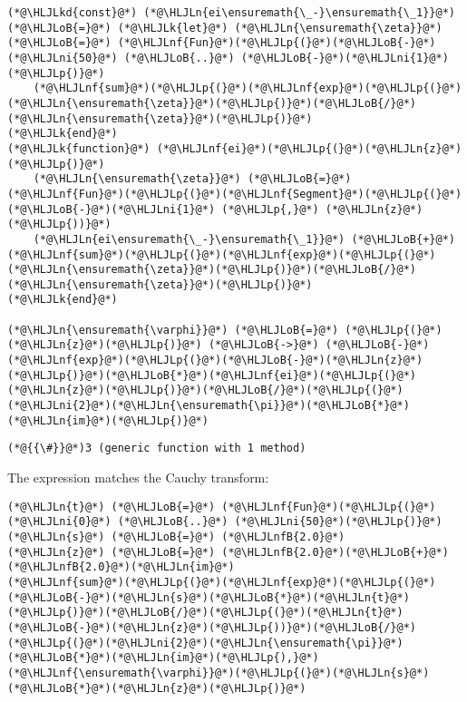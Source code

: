 \documentclass[12pt,landscape]{article}
\newcommand{\HLJLk}[1]{\textcolor[RGB]{148,91,176}{\textbf{#1}}}
\newcommand{\HLJLkd}[1]{\textcolor[RGB]{214,102,97}{\textit{#1}}}
\newcommand{\HLJLn}[1]{#1}
\newcommand{\HLJLnf}[1]{\textcolor[RGB]{66,102,213}{#1}}
\newcommand{\HLJLnfB}[1]{\textcolor[RGB]{59,151,46}{#1}}
\newcommand{\HLJLni}[1]{\textcolor[RGB]{59,151,46}{#1}}
\newcommand{\HLJLoB}[1]{\textcolor[RGB]{102,102,102}{\textbf{#1}}}
\newcommand{\HLJLp}[1]{#1}
\begin{document}
{\begin{lstlisting}
(*@\HLJLkd{const}@*) (*@\HLJLn{ei\ensuremath{\_-}\ensuremath{\_1}}@*) (*@\HLJLoB{=}@*) (*@\HLJLk{let}@*) (*@\HLJLn{\ensuremath{\zeta}}@*) (*@\HLJLoB{=}@*) (*@\HLJLnf{Fun}@*)(*@\HLJLp{(}@*)(*@\HLJLoB{-}@*)(*@\HLJLni{50}@*) (*@\HLJLoB{..}@*) (*@\HLJLoB{-}@*)(*@\HLJLni{1}@*)(*@\HLJLp{)}@*)
    (*@\HLJLnf{sum}@*)(*@\HLJLp{(}@*)(*@\HLJLnf{exp}@*)(*@\HLJLp{(}@*)(*@\HLJLn{\ensuremath{\zeta}}@*)(*@\HLJLp{)}@*)(*@\HLJLoB{/}@*)(*@\HLJLn{\ensuremath{\zeta}}@*)(*@\HLJLp{)}@*)
(*@\HLJLk{end}@*)
(*@\HLJLk{function}@*) (*@\HLJLnf{ei}@*)(*@\HLJLp{(}@*)(*@\HLJLn{z}@*)(*@\HLJLp{)}@*)
    (*@\HLJLn{\ensuremath{\zeta}}@*) (*@\HLJLoB{=}@*) (*@\HLJLnf{Fun}@*)(*@\HLJLp{(}@*)(*@\HLJLnf{Segment}@*)(*@\HLJLp{(}@*)(*@\HLJLoB{-}@*)(*@\HLJLni{1}@*) (*@\HLJLp{,}@*) (*@\HLJLn{z}@*)(*@\HLJLp{))}@*)
    (*@\HLJLn{ei\ensuremath{\_-}\ensuremath{\_1}}@*) (*@\HLJLoB{+}@*) (*@\HLJLnf{sum}@*)(*@\HLJLp{(}@*)(*@\HLJLnf{exp}@*)(*@\HLJLp{(}@*)(*@\HLJLn{\ensuremath{\zeta}}@*)(*@\HLJLp{)}@*)(*@\HLJLoB{/}@*)(*@\HLJLn{\ensuremath{\zeta}}@*)(*@\HLJLp{)}@*)
(*@\HLJLk{end}@*)

(*@\HLJLn{\ensuremath{\varphi}}@*) (*@\HLJLoB{=}@*) (*@\HLJLp{(}@*)(*@\HLJLn{z}@*)(*@\HLJLp{)}@*) (*@\HLJLoB{->}@*) (*@\HLJLoB{-}@*)(*@\HLJLnf{exp}@*)(*@\HLJLp{(}@*)(*@\HLJLoB{-}@*)(*@\HLJLn{z}@*)(*@\HLJLp{)}@*)(*@\HLJLoB{*}@*)(*@\HLJLnf{ei}@*)(*@\HLJLp{(}@*)(*@\HLJLn{z}@*)(*@\HLJLp{)}@*)(*@\HLJLoB{/}@*)(*@\HLJLp{(}@*)(*@\HLJLni{2}@*)(*@\HLJLn{\ensuremath{\pi}}@*)(*@\HLJLoB{*}@*)(*@\HLJLn{im}@*)(*@\HLJLp{)}@*)
\end{lstlisting}

\begin{lstlisting}
(*@{{\#}}@*)3 (generic function with 1 method)
\end{lstlisting}


The expression matches the Cauchy transform:


\begin{lstlisting}
(*@\HLJLn{t}@*) (*@\HLJLoB{=}@*) (*@\HLJLnf{Fun}@*)(*@\HLJLp{(}@*)(*@\HLJLni{0}@*) (*@\HLJLoB{..}@*) (*@\HLJLni{50}@*)(*@\HLJLp{)}@*)
(*@\HLJLn{s}@*) (*@\HLJLoB{=}@*) (*@\HLJLnfB{2.0}@*)
(*@\HLJLn{z}@*) (*@\HLJLoB{=}@*) (*@\HLJLnfB{2.0}@*)(*@\HLJLoB{+}@*)(*@\HLJLnfB{2.0}@*)(*@\HLJLn{im}@*)
(*@\HLJLnf{sum}@*)(*@\HLJLp{(}@*)(*@\HLJLnf{exp}@*)(*@\HLJLp{(}@*)(*@\HLJLoB{-}@*)(*@\HLJLn{s}@*)(*@\HLJLoB{*}@*)(*@\HLJLn{t}@*)(*@\HLJLp{)}@*)(*@\HLJLoB{/}@*)(*@\HLJLp{(}@*)(*@\HLJLn{t}@*)(*@\HLJLoB{-}@*)(*@\HLJLn{z}@*)(*@\HLJLp{))}@*)(*@\HLJLoB{/}@*)(*@\HLJLp{(}@*)(*@\HLJLni{2}@*)(*@\HLJLn{\ensuremath{\pi}}@*)(*@\HLJLoB{*}@*)(*@\HLJLn{im}@*)(*@\HLJLp{),}@*) (*@\HLJLnf{\ensuremath{\varphi}}@*)(*@\HLJLp{(}@*)(*@\HLJLn{s}@*)(*@\HLJLoB{*}@*)(*@\HLJLn{z}@*)(*@\HLJLp{)}@*)
\end{lstlisting}

}
\end{document}
